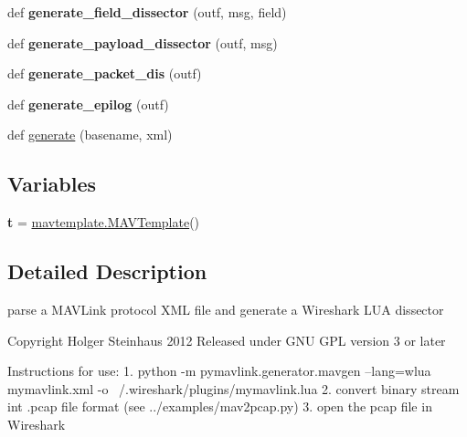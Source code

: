 \begin{DoxyCompactItemize}
\item 
\mbox{\label{namespacepymavlink_1_1generator_1_1mavgen__wlua_afe2afd7ec0108cdf0fa8c59ae3d305b0}} 
def {\bfseries generate\+\_\+field\+\_\+dissector} (outf, msg, field)
\item 
\mbox{\label{namespacepymavlink_1_1generator_1_1mavgen__wlua_a8e47b34f4ff18421908d9ccb5e532fa9}} 
def {\bfseries generate\+\_\+payload\+\_\+dissector} (outf, msg)
\item 
\mbox{\label{namespacepymavlink_1_1generator_1_1mavgen__wlua_ab1b596877b4a70281a8fc422674df76a}} 
def {\bfseries generate\+\_\+packet\+\_\+dis} (outf)
\item 
\mbox{\label{namespacepymavlink_1_1generator_1_1mavgen__wlua_aa34b360e4cc48e283746824c3b7cb416}} 
def {\bfseries generate\+\_\+epilog} (outf)
\item 
def \hyperlink{namespacepymavlink_1_1generator_1_1mavgen__wlua_a3d1e27fd417fd358d786d3383cb3cefd}{generate} (basename, xml)
\end{DoxyCompactItemize}
\subsection*{Variables}
\begin{DoxyCompactItemize}
\item 
\mbox{\label{namespacepymavlink_1_1generator_1_1mavgen__wlua_a8aa3596ee3c13af1cad0b541f7a51808}} 
{\bfseries t} = \hyperlink{classpymavlink_1_1generator_1_1mavtemplate_1_1MAVTemplate}{mavtemplate.\+M\+A\+V\+Template}()
\end{DoxyCompactItemize}


\subsection{Detailed Description}
\begin{DoxyVerb}parse a MAVLink protocol XML file and generate a Wireshark LUA dissector

Copyright Holger Steinhaus 2012
Released under GNU GPL version 3 or later

Instructions for use: 
1. python -m pymavlink.generator.mavgen --lang=wlua mymavlink.xml -o ~/.wireshark/plugins/mymavlink.lua
2. convert binary stream int .pcap file format (see ../examples/mav2pcap.py)
3. open the pcap file in Wireshark
\end{DoxyVerb}
 

